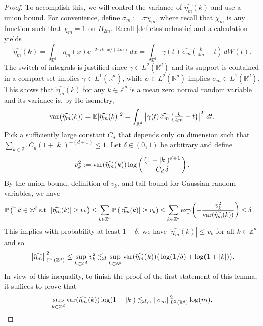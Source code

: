 \documentclass[11pt]{article}
\theoremstyle{definition}
\numberwithin{theorem}{section}
\numberwithin{lemma}{section}
\numberwithin{equation}{section}
\def\E{\mathbb{E}}
\def\P{\mathbb{P}}
\def\R{\mathbb{R}}
\def\Z{\mathbb{Z}}
\renewcommand{\hat}{\widehat}
\newcommand{\var}{{\rm var}}
\numberwithin{equation}{section}
\begin{document}
\begin{proof}
		To accomplish this, we will control the variance of $\hat{\eta_m}(k)$ and use a union bound. For convenience, define $\sigma_m:=\sigma \chi_m$, where recall that $\chi_m$ is any function such that $\chi_m=1$ on $B_{2m}$. Recall \cref{def:etastochastic} and a calculation yields
		$$
		\hat{\eta_m}(k)
		=\int_{\R^d} \eta_m(x) e^{-2\pi ik\cdot x/(4m)} \, dx
		=\int_{\R^d} \gamma(t) \, \hat {\sigma_m}\left(\tfrac k{4m}-t \right)  \, dW(t).
		$$
		The switch of integrals is justified since $\gamma \in L^2(\R^d)$ and its support is contained in a compact set implies $\gamma\in L^1(\R^d)$, while $\sigma\in L^2(\R^d)$ implies $\sigma_m\in L^1(\R^d)$. This shows that $\hat{\eta_m}(k)$ for any $k\in\Z^d$ is a mean zero normal random variable and its variance is, by Ito isometry,
		\begin{equation}
			\label{eq:etahelp2}
			\var(\hat{\eta_m}(k))
			= \E |\hat{\eta_m}(k)|^2
			= \int_{\R^d} \left| \gamma(t)  \, \hat {\sigma_m}\left(\tfrac k{4m}-t\right) \right|^2 \, dt.
		\end{equation}
		Pick a sufficiently large constant $C_d$ that depends only on dimension such that $\sum_{k\in\Z^d} C_d(1+|k|)^{-(d+1)}\leq 1$. Let $\delta\in (0,1)$ be arbitrary and define
		$$
		v_k^2:= \var(\hat{\eta_m}(k)) \log\left( \frac{(1+|k|)^{d+1}}{C_d \, \delta} \right). 
		$$
		By the union bound, definition of $v_k$, and tail bound for Gaussian random variables, we have
		\begin{align*}
			\P\left( \exists \, k\in\Z^d \text{ s.t. } |\hat{\eta_m}(k)| \geq v_k \right)
			&\leq \sum_{k\in \Z^d} \P\left(|\hat{\eta_m}(k)|\geq v_k\right) 
			\leq \sum_{k\in \Z^d} \exp\left(- \frac{v_k^2}{\var(\hat{\eta_m}(k))} \right)
			\leq \delta.
		\end{align*}
		This implies with probability at least $1-\delta$, we have $|\hat{\eta_m}(k)|\leq v_k$ for all $k\in \Z^d$ and so 
		\begin{equation*}
			\big\| \hat{\eta_m} \big\|_{\ell^\infty(\Z^d)}^2
			\leq \sup_{k\in \Z^d} v_k^2
			\lesssim_d \sup_{k\in \Z^d}   \var(\hat{\eta_m}(k)) \big(\log(1/\delta)+\log(1+|k|)\big). 
		\end{equation*}
		In view of this inequality, to finish the proof of the first statement of this lemma, it suffices to prove that
		\begin{equation}
			\label{eq:etahelp3}
			\sup_{k\in \Z^d} \var(\hat{\eta_m}(k)) \log(1+|k|)
			\lesssim_{d,\gamma} \|\sigma_m \|_{L^2(\R^d)}^2 \log(m). 
		\end{equation}

\end{proof}
\end{document}
